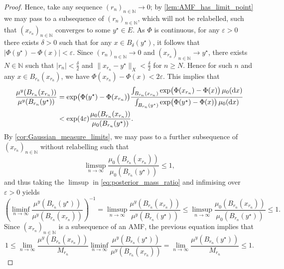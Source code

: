 \documentclass[11pt]{article}
\newcommand*{\cball}[2]{B_{#2}(#1)}
\newcommand*{\Naturals}{\mathbb{N}}
\newcommand*{\rd}{\mathrm{d}}
\renewcommand*{\geq}{\geqslant}
\renewcommand*{\leq}{\leqslant}
\theoremstyle{plain}
\theoremstyle{definition}
\newcommand{\absval}[1]{\lvert #1 \rvert}
\newcommand{\norm}[1]{\lVert #1 \rVert}
\numberwithin{equation}{section}
\numberwithin{figure}{section}
\numberwithin{table}{section}
\begin{document}
\begin{proof}
	Hence, take any sequence $(r_{n})_{n \in \Naturals} \to 0$; by \cref{lem:AMF_has_limit_point} we may pass to a subsequence of $(r_{n})_{n \in \Naturals}$, which will not be relabelled, such that $(x_{r_n})_{n \in \Naturals}$ converges to some $y^{\star} \in E$.
	As $\Phi$ is continuous, for any $\varepsilon > 0$ there exists $\delta > 0$ such that for any $x \in \cball{y^\star}{\delta}$, it follows that $\absval{\Phi(y^{\star}) - \Phi(x)} < \varepsilon$.
	Since $(r_n)_{n \in \Naturals} \to 0$ and $(x_{r_n})_{n \in \Naturals} \to y^{\star}$, there exists $N \in \Naturals$ such that $\absval{r_n} < \tfrac{\delta}{2}$ and $\norm{x_{r_n} - y^{\star}}_X < \tfrac{\delta}{2}$ for $n \geq N$.
	Hence for such $n$ and any $x \in \cball{x_{r_n}}{r_n}$, we have $\Phi(x_{r_n}) - \Phi(x) < 2\varepsilon$.
	This implies that
	\begin{align}
		\notag
		\frac{\mu^y(\cball{x_{r_n}}{r_n})}{\mu^y(\cball{y^{\star}}{r_n})} &= \exp\bigl(\Phi(y^{\star}) - \Phi(x_{r_n})\bigr) \frac{\int_{\cball{x_{r_n}}{r_n}} \exp\bigl(\Phi(x_{r_n}) - \Phi(x)\bigr)\,\mu_0(\rd x)}{\int_{\cball{y^{\star}}{r_n}} \exp\bigl(\Phi(y^{\star}) - \Phi(x)\bigr)\,\mu_0(\rd x)} \\
		\label{eq:posterior_mass_ratio}
		&< \exp(4\varepsilon) \frac{\mu_0(\cball{x_{r_n}}{r_n})}{\mu_0(\cball{y^{\star}}{r_n})}.
	\end{align}
	By \cref{cor:Gaussian_measure_limits}, we may pass to a further subsequence of $(x_{r_n})_{n \in \Naturals}$ without relabelling such that
	\begin{equation*}
		\limsup_{n \to \infty} \frac{\mu_0(\cball{x_{r_n}}{r_n})}{\mu_0(\cball{y^{\star}}{r_n})} \leq 1,
	\end{equation*}
	and thus taking the $\limsup$ in \eqref{eq:posterior_mass_ratio} and infimising over $\varepsilon > 0$ yields
	\begin{equation*}
		\left(\liminf_{n \to \infty} \frac{\mu^y(\cball{y^{\star}}{r_n})}{\mu^y(\cball{x_{r_n}}{r_n})}\right)^{-1} = \limsup_{n \to \infty} \frac{\mu^y(\cball{x_{r_{n}}}{r_{n}})}{\mu^y(\cball{y^{\star}}{r_{n}})} \leq \limsup_{n \to \infty} \frac{\mu_0(\cball{x_{r_{n}}}{r_{n}})}{\mu_0(\cball{y^{\star}}{r_{n}})} \leq 1.
	\end{equation*}
	Since $(x_{r_{n}})_{n \in \Naturals}$ is a subsequence of an AMF, the previous equation implies that
	\begin{equation*}
		1 \leq \lim_{n \to \infty} \frac{\mu^y(\cball{x_{r_{n}}}{r_{n}})}{M_{r_{n}}} \liminf_{n \to \infty} \frac{\mu^y(\cball{y^{\star}}{r_{n}})}{\mu^y(\cball{x_{r_{n}}}{r_{n}})} = \lim_{n \to \infty} \frac{\mu^y(\cball{y^{\star}}{r_{n}})}{M_{r_{n}}}  \leq 1.

\end{equation*}
\end{proof}
\end{document}
